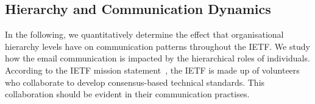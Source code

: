 \documentclass[twocolumn,10pt]{article}
\begin{document}
\subsection{Hierarchy and Communication Dynamics}
\label{sec:org-dyn:hierarchy}


In the following, we quantitatively determine the effect that organisational
hierarchy levels have on communication patterns throughout the IETF. 
We study how the email communication is impacted by the hierarchical roles
of individuals. According to the IETF mission statement~\cite{rfc3935}, the
IETF is made up of volunteers who collaborate to develop consensus-based
technical standards. This collaboration should be evident in their
communication practises.

\end{document}
